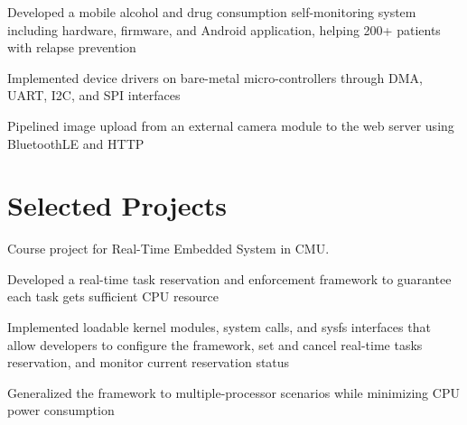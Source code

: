 \documentclass[letterpaper]{deedy-resume} %
\begin{document}
\begin{minipage}[t]{0.645\textwidth}
\sectionspace


\begin{tightitemize}
\item Developed a mobile alcohol and drug consumption self-monitoring system including hardware, firmware, and Android application, helping 200+ patients with relapse prevention
\item Implemented device drivers on bare-metal micro-controllers through DMA, UART, I2C, and SPI interfaces
\item Pipelined image upload from an external camera module to the web server using BluetoothLE and HTTP
\end{tightitemize}


\section{Selected Projects}

\descript{}
Course project for Real-Time Embedded System in CMU. \\
\begin{tightitemize}
\item Developed a real-time task reservation and enforcement framework to guarantee each task gets sufficient CPU resource
\item Implemented loadable kernel modules, system calls, and sysfs interfaces that allow developers to configure the framework, set and cancel real-time tasks reservation, and monitor current reservation status
\item Generalized the framework to multiple-processor scenarios while minimizing CPU power consumption
\end{tightitemize}



\end{minipage}
\end{document}
